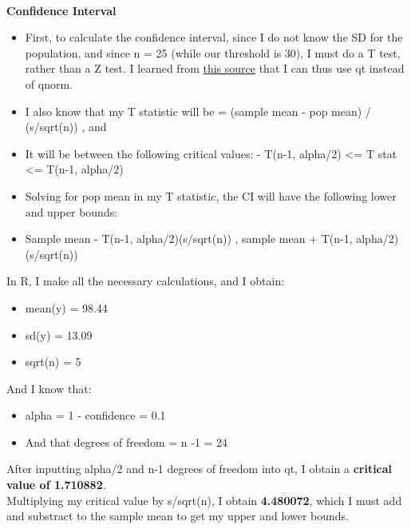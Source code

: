 \documentclass[12pt,letterpaper]{article}
\begin{document}
\newpage


 \\

\noindent \textbf {Confidence Interval}

\begin{itemize}
	\item  First, to calculate the confidence interval, since I do not know the SD for the population, and since n = 25 (while our threshold is 30), I must do a T test, rather than a Z test. I learned from \href{https://www.statology.org/working-with-the-student-t-distribution-in-r-dt-qt-pt-rt/}{this source}  that I can thus use qt instead of qnorm.
	\item I also know that my T statistic will be =  (sample mean - pop mean) / (s/sqrt(n)) , and
	\item It will be between the following critical values:  - T(n-1, alpha/2) <= T stat <= T(n-1, alpha/2)
	\item Solving for pop mean in my T statistic, the CI will have the following lower and upper bounds:
	\item Sample mean - T(n-1, alpha/2)(s/sqrt(n)) , sample mean + T(n-1, alpha/2)(s/sqrt(n))

\end{itemize}

In R, I make all the necessary calculations, and I obtain: 

\begin{itemize}
\item mean(y) = 98.44
\item sd(y) = 13.09
\item sqrt(n) = 5
\end{itemize}

And I know that:

\begin{itemize}
\item alpha = 1 - confidence = 0.1
\item And that degrees of freedom = n -1 = 24
\end{itemize}

\noindent After inputting alpha/2 and n-1 degrees of freedom into qt, I obtain a \textbf{critical value of 1.710882}. \\

\noindent Multiplying my critical value by s/sqrt(n), I obtain  \textbf{4.480072}, which I must add and substract to the sample mean to get my upper and lower bounds. \\
\end{document}

